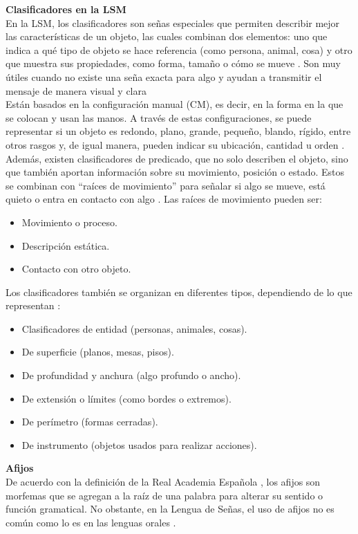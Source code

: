 \textbf{Clasificadores en la LSM}\\
En la LSM, los clasificadores son señas especiales que permiten describir mejor las características de un objeto, las cuales combinan dos elementos: uno que indica a qué tipo de objeto se hace referencia (como persona, animal, cosa) y otro que muestra sus propiedades, como forma, tamaño o cómo se mueve \cite{ref37}. Son muy útiles cuando no existe una seña exacta para algo y ayudan a transmitir el mensaje de manera visual y clara\\

Están basados en la configuración manual (CM), es decir, en la forma en la que se colocan y usan las manos. A través de estas configuraciones, se puede representar si un objeto es redondo, plano, grande, pequeño, blando, rígido, entre otros rasgos y, de igual manera, pueden indicar su ubicación, cantidad u orden \cite{ref37}.\\

Además, existen clasificadores de predicado, que no solo describen el objeto, sino que también aportan información sobre su movimiento, posición o estado. Estos se combinan con “raíces de movimiento” para señalar si algo se mueve, está quieto o entra en contacto con algo \cite{ref37}. Las raíces de movimiento pueden ser:
\begin{itemize}
    \item Movimiento o proceso.
    \item Descripción estática.
    \item Contacto con otro objeto.
\end{itemize}

Los clasificadores también se organizan en diferentes tipos, dependiendo de lo que representan \cite{ref37}:
\begin{itemize}
    \item Clasificadores de entidad (personas, animales, cosas).
    \item De superficie (planos, mesas, pisos).
    \item De profundidad y anchura (algo profundo o ancho).
    \item De extensión o límites (como bordes o extremos).
    \item De perímetro (formas cerradas).
    \item De instrumento (objetos usados para realizar acciones).
\end{itemize}

\textbf{Afijos}\\
De acuerdo con la definición de la Real Academia Española \cite{refrae}, los afijos son morfemas que se agregan a la raíz de una palabra para alterar su sentido o función gramatical. No obstante, en la Lengua de Señas, el uso de afijos no es común como lo es en las lenguas orales \cite{ref37}.\\

